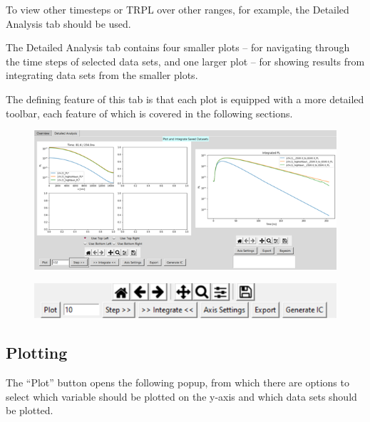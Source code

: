 \documentclass[11pt,letterpaper,titlepage]{article}
\begin{document}
		\par To view other timesteps or TRPL over other ranges, for example, the Detailed Analysis tab should be used.
		
		\par The Detailed Analysis tab contains four smaller plots – for navigating through the time steps of selected data sets, and one larger plot – for showing results from integrating data sets from the smaller plots.
		
		\par The defining feature of this tab is that each plot is equipped with a more detailed toolbar, each feature of which is covered in the following sections.
		
		\begin{figure}[H]
			\label{fig:detailed_example}
			\centering
			\includegraphics[scale=1]{"detailed_example"}
		\end{figure}
		
		\begin{figure}[H]
			\label{fig:detailed_toolbar}
			\centering
			\includegraphics[scale=1]{"detailed_toolbar"}
		\end{figure}
	
		\subsection{Plotting}
		
		\par The “Plot” button opens the following popup, from which there are options to select which variable should be plotted on the y-axis and which data sets should be plotted.
		
\end{document}
